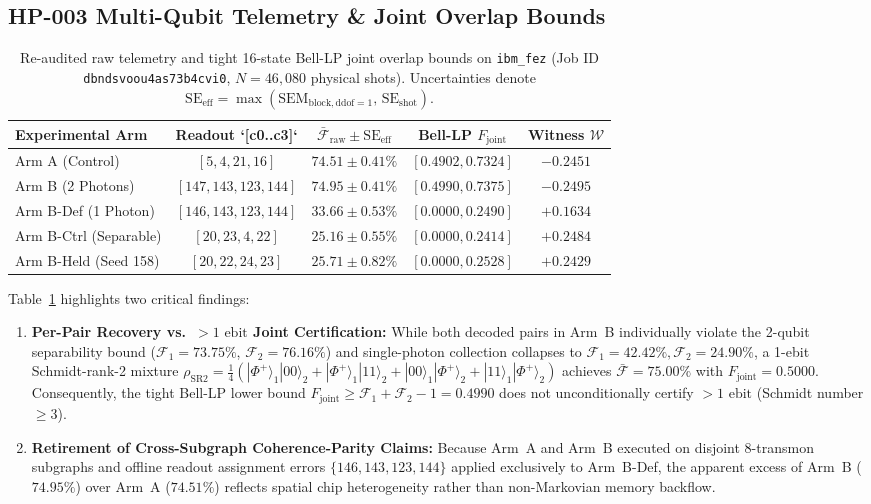 \documentclass[aps,prxquantum,reprint,superscriptaddress,floatfix]{revtex4-2}
\begin{document}
\subsection{HP-003 Multi-Qubit Telemetry \& Joint Overlap Bounds}

\begin{table}[t]
\centering
\caption{Re-audited raw telemetry and tight 16-state Bell-LP joint overlap bounds on \texttt{ibm\_fez} (Job ID \texttt{dbndsvoou4as73b4cvi0}, $N = 46{,}080$ physical shots). Uncertainties denote $\mathrm{SE}_{\mathrm{eff}} = \max(\mathrm{SEM}_{\mathrm{block,ddof=1}},\, \mathrm{SE}_{\mathrm{shot}})$.}
\label{tab:hp003_results}
\begin{tabular}{lcccc}
\toprule
Experimental Arm & Readout `[c0..c3]` & $\bar{\mathcal{F}}_{\mathrm{raw}} \pm \mathrm{SE}_{\mathrm{eff}}$ & Bell-LP $F_{\mathrm{joint}}$ & Witness $\mathcal{W}$ \\
\midrule
Arm A (Control) & $[5, 4, 21, 16]$ & $74.51 \pm 0.41\%$ & $[0.4902, 0.7324]$ & $-0.2451$ \\
Arm B (2 Photons) & $[147, 143, 123, 144]$ & $\mathbf{74.95 \pm 0.41\%}$ & $\mathbf{[0.4990, 0.7375]}$ & $\mathbf{-0.2495}$ \\
Arm B-Def (1 Photon) & $[146, 143, 123, 144]$ & $33.66 \pm 0.53\%$ & $[0.0000, 0.2490]$ & $+0.1634$ \\
Arm B-Ctrl (Separable) & $[20, 23, 4, 22]$ & $25.16 \pm 0.55\%$ & $[0.0000, 0.2414]$ & $+0.2484$ \\
Arm B-Held (Seed 158) & $[20, 22, 24, 23]$ & $25.71 \pm 0.82\%$ & $[0.0000, 0.2528]$ & $+0.2429$ \\
\bottomrule
\end{tabular}
\end{table}

Table~\ref{tab:hp003_results} highlights two critical findings:
\begin{enumerate}
    \item \textbf{Per-Pair Recovery vs.\ $>1\text{ ebit}$ Joint Certification:} While both decoded pairs in Arm~B individually violate the 2-qubit separability bound ($\mathcal{F}_1 = 73.75\%$, $\mathcal{F}_2 = 76.16\%$) and single-photon collection collapses to $\mathcal{F}_1 = 42.42\%, \mathcal{F}_2 = 24.90\%$, a 1-ebit Schmidt-rank-2 mixture $\rho_{\mathrm{SR2}} = \frac{1}{4}(|\Phi^+\rangle_1|00\rangle_2 + |\Phi^+\rangle_1|11\rangle_2 + |00\rangle_1|\Phi^+\rangle_2 + |11\rangle_1|\Phi^+\rangle_2)$ achieves $\bar{\mathcal{F}} = 75.00\%$ with $F_{\mathrm{joint}} = 0.5000$. Consequently, the tight Bell-LP lower bound $F_{\mathrm{joint}} \ge \mathcal{F}_1 + \mathcal{F}_2 - 1 = 0.4990$ does not unconditionally certify $>1\text{ ebit}$ (Schmidt number $\ge 3$).
    \item \textbf{Retirement of Cross-Subgraph Coherence-Parity Claims:} Because Arm~A and Arm~B executed on disjoint 8-transmon subgraphs and offline readout assignment errors $\{146, 143, 123, 144\}$ applied exclusively to Arm~B-Def, the apparent excess of Arm~B ($74.95\%$) over Arm~A ($74.51\%$) reflects spatial chip heterogeneity rather than non-Markovian memory backflow.
\end{enumerate}
\end{document}
